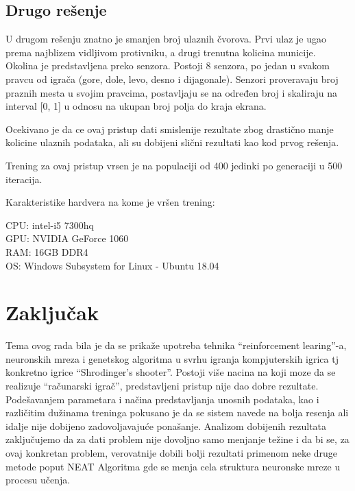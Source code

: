 \documentclass[a4paper]{article}
\begin{document}
\subsection {Drugo rešenje}
\par U drugom rešenju znatno je smanjen broj ulaznih čvorova. Prvi ulaz je ugao prema najblizem vidljivom protivniku, a drugi trenutna kolicina municije. Okolina je predstavljena preko senzora. Postoji 8 senzora, po jedan u svakom pravcu od igrača (gore, dole, levo, desno i dijagonale).  Senzori proveravaju broj praznih mesta u svojim pravcima,  postavljaju se na određen broj i skaliraju na interval [0, 1] u odnosu na ukupan broj polja do kraja ekrana. 

Ocekivano je da ce ovaj pristup dati smislenije rezultate zbog drastično manje kolicine ulaznih podataka, ali su dobijeni slični rezultati kao kod prvog rešenja.

Trening za ovaj pristup vrsen je na populaciji od 400 jedinki po generaciji u 500 iteracija.
\newline
\begin{tcolorbox}
\begin {center}
Karakteristike hardvera na kome je vršen trening: \\
\end {center}
CPU: intel-i5 7300hq \\
GPU: NVIDIA GeForce 1060 \\
RAM: 16GB DDR4 \\
OS: Windows Subsystem for Linux - Ubuntu 18.04 \\
\end{tcolorbox}


 \newpage
\section{Zaključak}
\label{sec:zakljucak}

\par Tema ovog rada bila je da se prikaže upotreba tehnika “reinforcement learing”-a,  neuronskih mreza i genetskog algoritma u svrhu igranja kompjuterskih igrica tj konkretno igrice “Shrodinger's shooter”. Postoji više nacina na koji moze da se realizuje “računarski igrač”,  predstavljeni pristup nije dao dobre rezultate. Podešavanjem parametara i načina predstavljanja unosnih podataka, kao i različitim dužinama treninga pokusano je da se sistem navede na bolja resenja ali idalje nije dobijeno zadovoljavajuće ponašanje. Analizom dobijenih rezultata zaključujemo da za dati problem nije dovoljno samo menjanje težine i da bi se, za ovaj konkretan problem, verovatnije dobili bolji rezultati primenom neke druge metode poput NEAT\cite{neat}  Algoritma gde se menja cela struktura neuronske mreze u procesu učenja.


 

\end{document}
